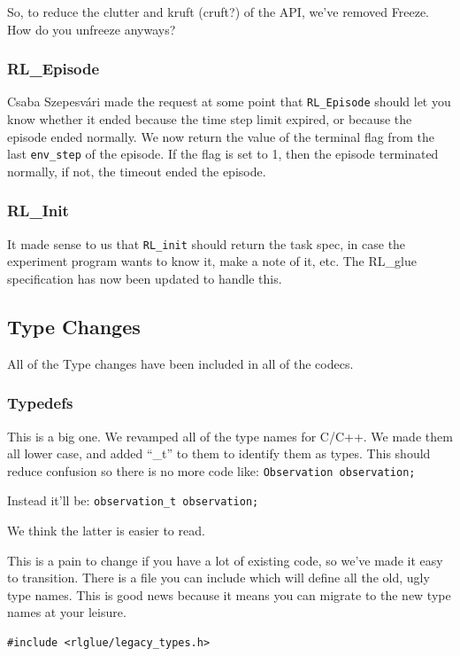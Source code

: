 \documentclass[11pt]{article}
\begin{document}
So, to reduce the clutter and kruft (cruft?) of the API, we've removed Freeze.  How do you unfreeze anyways?

\subsubsection{RL\_Episode}
Csaba Szepesvári made the request at some point that \texttt{RL\_Episode} should let you know whether it ended because the time step limit expired, or because the episode ended normally.  We now return the value of the terminal flag from the last \texttt{env\_step} of the episode. If the flag is set to 1, then the episode terminated normally, if not, the timeout ended the episode.  

\subsubsection{RL\_Init}
It made sense to us that \texttt{RL\_init} should return the task spec, in case the experiment program wants to know it, make a note of it, etc. The RL\_glue specification has now been updated to handle this.

\subsection{Type Changes}
All of the Type changes have been included in all of the codecs.

\subsubsection{Typedefs}
This is a big one. We revamped all of the type names for C/C++.  We made them all lower case, and added ``\_t'' to them to identify them as types.  This should reduce confusion so there is no more code like:\newline
\texttt{Observation observation;}

Instead it'll be:\newline
\texttt{observation\_t observation;}

We think the latter is easier to read.

This is a pain to change if you have a lot of existing code, so we've made it easy to transition.  There is a file you can include which will define all the old, ugly type names. This is good news because it means you can migrate to the new type names at your leisure.
\begin{verbatim}
#include <rlglue/legacy_types.h>
\end{verbatim}
\end{document}
